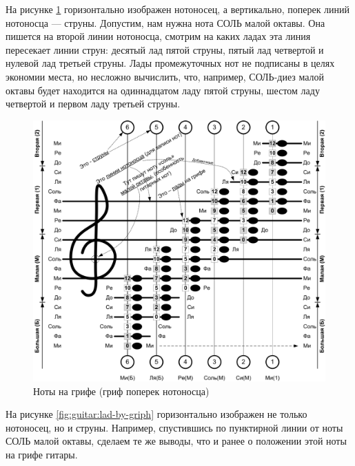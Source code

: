 На рисунке \ref{fig:guitar:lad-by-notes} горизонтально изображен нотоносец, а вертикально, поперек линий нотоносца --- струны. Допустим, нам нужна нота СОЛЬ малой октавы. Она пишется на второй линии нотоносца, смотрим на каких ладах эта линия пересекает линии струн: десятый лад пятой струны, пятый лад четвертой и нулевой лад третьей струны. Лады промежуточных нот не подписаны в целях экономии места, но несложно вычислить, что, например, СОЛЬ-диез малой октавы будет находится на одиннадцатом ладу пятой струны, шестом ладу четвертой и первом ладу третьей струны.
 
\begin{figure}[!ht]
    \centering
    \includegraphics[width=\textwidth]{fig/lad-by-notes} 
    \caption{Ноты на грифе (гриф поперек нотоносца)}\label{fig:guitar:lad-by-notes}
\end{figure} 

На рисунке \ref{fig:guitar:lad-by-griph} горизонтально изображен не только нотоносец, но и струны. Например, спустившись по пунктирной линии от ноты СОЛЬ малой октавы, сделаем те же выводы, что и ранее о положении этой ноты на грифе гитары. 


